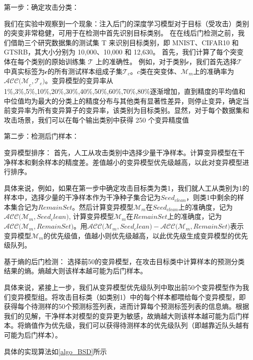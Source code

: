 \documentclass[fontset=macnew,UTF8]{article} %
\begin{document}
第一步：确定攻击分类：

我们在实验中观察到一个现象：注入后门的深度学习模型对于目标（受攻击）类别的突变非常稳健，可用于在检测中首先识别目标类别。 在在线后门检测之前，我们借助三个研究数据集的测试集 T 来识别目标类别，即 MNIST、CIFAR10 和 GTSRB，其大小分别为 10,000、10,000 和 12,630。
首先，我们计算了每个突变体在每个类别的原始训练集 $\mathcal{T}$ 上的准确性。 例如，对于类别$\mathcal{c}$，我们首先选择$\mathcal{T}$ 中真实标签为$\mathcal{c}$的所有测试样本组成子集$\mathcal{T}_c$。$c$类在突变体、$\mathcal{M}_m$上的准确率为$\mathcal{ACC(M}_c,\mathcal{T}_c)$。变异模型的变异率从1\%,3\%,5\%,10\%,20\%,30\%,40\%,50\%,60\%,70\%,80\%逐渐增加，直到精度的平均值和中位值均为最大的分类上的精度分布与其他类有显著性差异，则停止变异，确定当前变异率为所有变异算子的变异率，该类别为目标类别。显然，对于每个数据集和攻击场景，我们可以在每个输出类别中获得 250 个变异精度值

第二步：检测后门样本：

变异模型排序：
首先，人工从攻击类别中选择少量干净样本。计算变异模型在干净样本和剩余样本的精度差。差值越小的变异模型优先级越高，以此对变异模型进行排序。

具体来说，例如，如果在第一步中确定攻击目标类为类1，我们就人工从类别为1的样本中，选择少量的干净样本作为干净种子集合记为$Seed_{clean}$，则类1中剩余的样本集合记为$RemainSet$。然后计算变异模型$\mathcal{M}_m$在$Seed_{clean}$上的准确度，记为$\mathcal{ACC(}\mathcal{M}_m, Seed_clean\mathcal{)}$,  计算变异模型$\mathcal{M}_m$在$RemainSet$上的准确度，记为$\mathcal{ACC(}\mathcal{M}_m, RemainSet\mathcal{)}$。用$\mathcal{ACC(}\mathcal{M}_m,Seed_clean\mathcal{)}-\mathcal{ACC(}\mathcal{M}_m,RemainSet\mathcal{)}$表示变异模型$\mathcal{M}_m$的优先级值，值越小则优先级越高，以此优先级生成变异模型的优先级队列。

基于熵的后门检测：
选择前50的变异模型，在攻击目标类中计算样本的预测分类结果的熵。熵越大则该样本越可能为后门样本。

具体来说，紧接上一步，我们从变异模型优先级队列中取出前50个变异模型作为我们变异模型组。将攻击目标类（如类别1）中的每个样本都喂给每个变异模型，即获得每个待测样的50个预测标签列表，进而计算每个预测标签列表的信息熵。根据我们的见解，干净样本对模型的变异更为敏感，故熵越大则该样本越可能为后门样本。将熵值作为优先级，我们可以获得待测样本的优先级队列（即越靠近队头越有可能为后门样本）。

具体的实现算法如\ref{algo_BSD}所示
\end{document}
